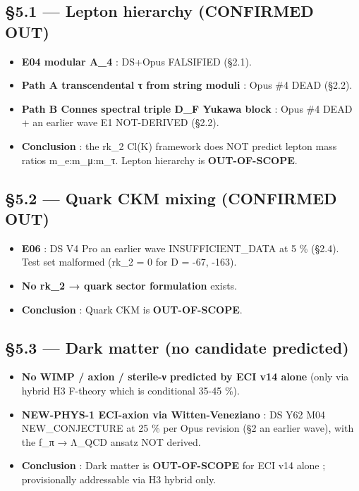 \documentclass[
  11pt,
  a4paper,
]{article}
\providecommand{\tightlist}{\setlength{\itemsep}{0pt}\setlength{\parskip}{0pt}}
\providecommand{\tightlist}{%
  \setlength{\itemsep}{0pt}\setlength{\parskip}{0pt}}
\begin{document}
\hypertarget{lepton-hierarchy-confirmed-out}{%
\subsection{§5.1 --- Lepton hierarchy (CONFIRMED OUT)}\label{lepton-hierarchy-confirmed-out}}

\begin{itemize}
\tightlist
\item
  \textbf{E04 modular A\_4} : DS+Opus FALSIFIED (§2.1).
\item
  \textbf{Path A transcendental τ from string moduli} : Opus \#4 DEAD (§2.2).
\item
  \textbf{Path B Connes spectral triple D\_F Yukawa block} : Opus \#4 DEAD + an earlier wave E1 NOT-DERIVED (§2.2).
\item
  \textbf{Conclusion} : the rk\_2 Cl(K) framework does NOT predict lepton mass ratios m\_e:m\_μ:m\_τ. Lepton hierarchy is \textbf{OUT-OF-SCOPE}.
\end{itemize}

\hypertarget{quark-ckm-mixing-confirmed-out}{%
\subsection{§5.2 --- Quark CKM mixing (CONFIRMED OUT)}\label{quark-ckm-mixing-confirmed-out}}

\begin{itemize}
\tightlist
\item
  \textbf{E06} : DS V4 Pro an earlier wave INSUFFICIENT\_DATA at 5 \% (§2.4). Test set malformed (rk\_2 = 0 for D = -67, -163).
\item
  \textbf{No rk\_2 → quark sector formulation} exists.
\item
  \textbf{Conclusion} : Quark CKM is \textbf{OUT-OF-SCOPE}.
\end{itemize}

\hypertarget{dark-matter-no-candidate-predicted}{%
\subsection{§5.3 --- Dark matter (no candidate predicted)}\label{dark-matter-no-candidate-predicted}}

\begin{itemize}
\tightlist
\item
  \textbf{No WIMP / axion / sterile-ν predicted by ECI v14 alone} (only via hybrid H3 F-theory which is conditional 35-45 \%).
\item
  \textbf{NEW-PHYS-1 ECI-axion via Witten-Veneziano} : DS Y62 M04 NEW\_CONJECTURE at 25 \% per Opus revision (§2 an earlier wave), with the f\_π → Λ\_QCD ansatz NOT derived.
\item
  \textbf{Conclusion} : Dark matter is \textbf{OUT-OF-SCOPE} for ECI v14 alone ; provisionally addressable via H3 hybrid only.
\end{itemize}
\end{document}
